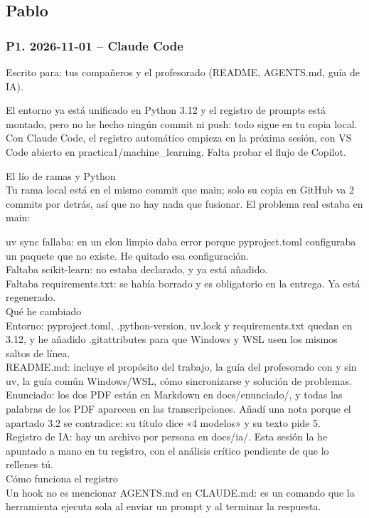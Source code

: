 \documentclass[11pt,a4paper]{article}
\begin{document}
\subsection*{Pablo}
\subsubsection*{P1. 2026-11-01 -- Claude Code}
{\small
Escrito para: tus compañeros y el profesorado (README, AGENTS.md, guía de IA).

El entorno ya está unificado en Python 3.12 y el registro de prompts está montado, pero no he hecho ningún commit ni push: todo sigue en tu copia local. Con Claude Code, el registro automático empieza en la próxima sesión, con VS Code abierto en practica1/\allowbreak{}machine\_\allowbreak{}learning. Falta probar el flujo de Copilot.

El lío de ramas y Python \\{}
Tu rama local está en el mismo commit que main; solo su copia en GitHub va 2 commits por detrás, así que no hay nada que fusionar. El problema real estaba en main:

uv sync fallaba: en un clon limpio daba error porque pyproject.toml configuraba un paquete que no existe. He quitado esa configuración. \\{}
Faltaba scikit-learn: no estaba declarado, y ya está añadido. \\{}
Faltaba requirements.txt: se había borrado y es obligatorio en la entrega. Ya está regenerado. \\{}
Qué he cambiado \\{}
Entorno: pyproject.toml, .python-version, uv.lock y requirements.txt quedan en 3.12, y he añadido .gitattributes para que Windows y WSL usen los mismos saltos de línea. \\{}
README.md: incluye el propósito del trabajo, la guía del profesorado con y sin uv, la guía común Windows/\allowbreak{}WSL, cómo sincronizarse y solución de problemas. \\{}
Enunciado: los dos PDF están en Markdown en docs/\allowbreak{}enunciado/\allowbreak{}, y todas las palabras de los PDF aparecen en las transcripciones. Añadí una nota porque el apartado 3.2 se contradice: su título dice «4 modelos» y su texto pide 5. \\{}
Registro de IA: hay un archivo por persona en docs/\allowbreak{}ia/\allowbreak{}. Esta sesión la he apuntado a mano en tu registro, con el análisis crítico pendiente de que lo rellenes tú. \\{}
Cómo funciona el registro \\{}
Un hook no es mencionar AGENTS.md en CLAUDE.md: es un comando que la herramienta ejecuta sola al enviar un prompt y al terminar la respuesta.

}
\end{document}
